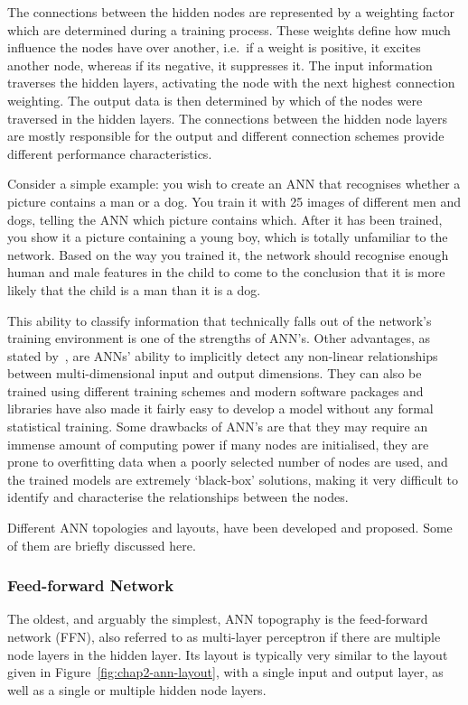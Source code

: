 The connections between the hidden nodes are represented by a weighting factor which are determined during a training process. These weights define how much influence the nodes have over another, i.e.\ if a weight is positive, it excites another node, whereas if its negative, it suppresses it. The input information traverses the hidden layers, activating the node with the next highest connection weighting. The output data is then determined by which of the nodes were traversed in the hidden layers. The connections between the hidden node layers are mostly responsible for the output and different connection schemes provide different performance characteristics. 

Consider a simple example: you wish to create an ANN that recognises whether a picture contains a man or a dog. You train it with 25 images of different men and dogs, telling the ANN which picture contains which. After it has been trained, you show it a picture containing a young boy, which is totally unfamiliar to the network. Based on the way you trained it, the network should recognise enough human and male features in the child to come to the conclusion that it is more likely that the child is a man than it is a dog. 

This ability to classify information that technically falls out of the network's training environment is one of the strengths of ANN's. Other advantages, as stated by~\cite{tu1996advantages}, are ANNs' ability to implicitly detect any non-linear relationships between multi-dimensional input and output dimensions. They can also be trained using different training schemes and modern software packages and libraries have also made it fairly easy to develop a model without any formal statistical training. Some drawbacks of ANN's are that they may require an immense amount of computing power if many nodes are initialised, they are prone to overfitting data when a poorly selected number of nodes are used, and the trained models are extremely `black-box' solutions, making it very difficult to identify and characterise the relationships between the nodes. 

Different ANN topologies and layouts, have been developed and proposed. Some of them are briefly discussed here.

\subsubsection{Feed-forward Network}

The oldest, and arguably the simplest, ANN topography is the feed-forward network (FFN), also referred to as multi-layer perceptron if there are multiple node layers in the hidden layer. Its layout is typically very similar to the layout given in Figure~\ref{fig:chap2-ann-layout}, with a single input and output layer, as well as a single or multiple hidden node layers. 


